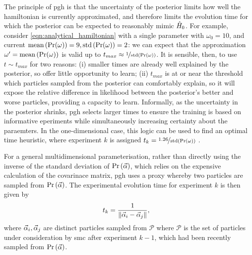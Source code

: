 The principle of \gls{pgh} is that the uncertainty of the posterior limits how well the \gls{hamiltonian} is currently 
    approximated, and therefore limits the evolution time for which the posterior can be expected to 
    reasonably mimic $\hat{H}_0$\footnotemark.
For example, consider \cref{eqn:analytical_hamiltonian} with a single parameter with $\omega_0 = 10$,
    and current $\textrm{mean}\left(\Pr(\omega)\right) = 9, \textrm{std}\left(\Pr(\omega)\right) = 2$:
    we can expect that the approximation $\omega^{\prime} = \textrm{mean}\left(\Pr(\omega)\right)$ 
    is valid up to $t_{max} \approx \nicefrac{1}{\textrm{std}\left(\Pr(\omega)\right)}$. 
It is sensible, then, to use $t \sim t_{max}$ for two reasons: 
    (i) smaller times are already well explained by the posterior, so offer little opportunity to learn;
    (ii) $t_{max}$ is at or near the threshold which \glspl{particle} sampled from the posterior can comfortably explain, 
        so it will expose the relative difference in \gls{likelihood} between the posterior's better and worse \glspl{particle}, 
        providing a capacity to learn. 
Informally, as the uncertainty in the posterior shrinks, \gls{pgh} selects larger times 
    to ensure the training is based on informative eperiments while 
    simultaneously increasing certainty about the paraemters. 
In the one-dimensional case, this logic can be used to find an optimal time heuristic, 
    where \gls{experiment} $k$ is assigned $t_k = \nicefrac{1.26}{\textrm{std}\left(\Pr(\omega)\right)}$ \cite{ferrie2013best}. 
\par
For a general multidimensional parameterisation, 
    rather than directly using the inverse of the standard deviation of $\Pr \left(\vec{\alpha}\right)$, 
    which relies on the expensive calculation of the covarinace matrix, 
    \gls{pgh} uses a proxy whereby two \glspl{particle} are sampled from $\Pr \left(\vec{\alpha}\right)$. 
The experimental evolution time for \gls{experiment} $k$ is then given by 
\begin{equation}
    \label{eqn:pgh_time}
    t_k = \frac{1}{\| \vec{\alpha}_i - \vec{\alpha}_j \|}, 
\end{equation}
    where $\vec{\alpha}_i, \vec{\alpha}_j$ are distinct \glspl{particle} sampled from $\mathcal{P}$ where 
    $\mathcal{P}$ is the set of \glspl{particle} under consideration by \gls{smc} after \gls{experiment} $k-1$, 
    which had been recently sampled from $\Pr\left(\vec{\alpha}\right)$. 
\par 


